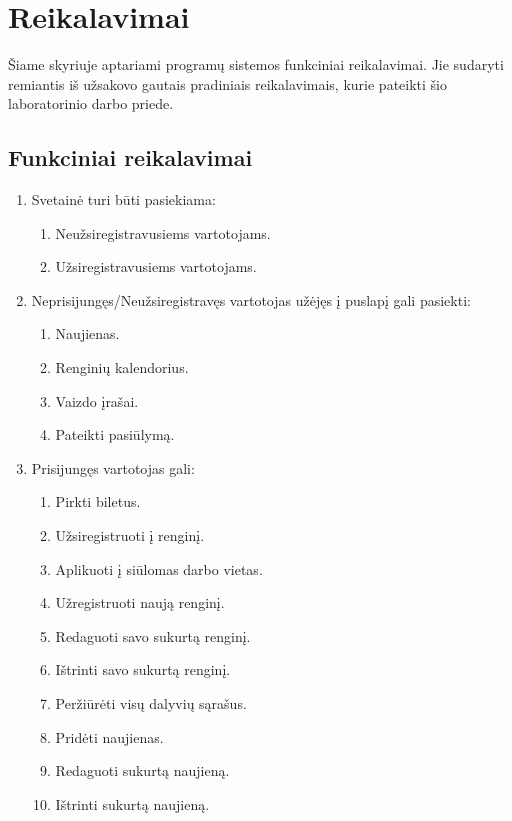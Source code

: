 \documentclass{VUMIFPSkursinis}
\begin{document}
    \section{Reikalavimai} \label{reikalavimai}
		Šiame skyriuje aptariami programų sistemos funkciniai reikalavimai. Jie sudaryti remiantis iš užsakovo gautais pradiniais reikalavimais, kurie pateikti šio laboratorinio darbo priede.
        \subsection{Funkciniai reikalavimai} \label{reikalavimai_fr}
			\begin{enumerate}[label=\textbf{FR\arabic*}]
				\item Svetainė turi būti pasiekiama:
					\begin{enumerate}[label*=\textbf{.\arabic*}]
						\item Neužsiregistravusiems vartotojams.
						\item Užsiregistravusiems vartotojams.
					\end{enumerate}
				\item Neprisijungęs/Neužsiregistravęs vartotojas užėjęs į puslapį gali pasiekti:
					\begin{enumerate}[label*=\textbf{.\arabic*}]
						\item Naujienas.
						\item Renginių kalendorius.
						\item Vaizdo įrašai.
						\item Pateikti pasiūlymą.
					\end{enumerate}	
				\item Prisijungęs vartotojas gali:
					\begin{enumerate}[label*=\textbf{.\arabic*}]
						\item Pirkti biletus.
						\item Užsiregistruoti į renginį.
						\item Aplikuoti į siūlomas darbo vietas.
						\item Užregistruoti naują renginį.
						\item Redaguoti savo sukurtą renginį.
						\item Ištrinti savo sukurtą renginį.
						\item Peržiūrėti visų dalyvių sąrašus.
						\item Pridėti naujienas.
						\item Redaguoti sukurtą naujieną.
						\item Ištrinti sukurtą naujieną.

\end{enumerate}
\end{enumerate}
\end{document}
